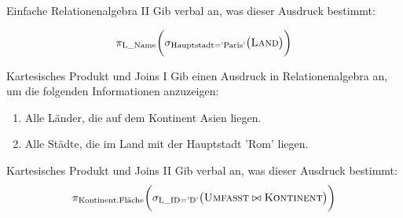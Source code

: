 \documentclass[12pt,a4paper,notitlepage,leqno]{article}
\begin{document}
\begin{aufgabe}{Einfache Relationenalgebra II}
Gib verbal an, was dieser Ausdruck bestimmt:

\[\pi_{\textrm{L\_Name}}\biggl(\sigma_{\textrm{Hauptstadt='Paris'}}\bigl(\textsc{Land}\bigr)\biggr)\]

\end{aufgabe}

\begin{aufgabe}{Kartesisches Produkt und Joins I}
Gib einen Ausdruck in Relationenalgebra an, um die folgenden Informationen anzuzeigen:
\begin{enumerate}
    \item Alle Länder, die auf dem Kontinent Asien liegen.
    \item Alle Städte, die im Land mit der Hauptstadt 'Rom' liegen.
\end{enumerate}    
\end{aufgabe}

\begin{aufgabe}{Kartesisches Produkt und Joins II}
Gib verbal an, was dieser Ausdruck bestimmt:
\[\pi_{\textrm{Kontinent.Fläche}}\biggl(\sigma_{\textrm{L\_ID='D'}}\bigl(\textsc{Umfasst}\bowtie\textsc{Kontinent}\bigr)\biggr)\]
\end{aufgabe}
\end{document}
